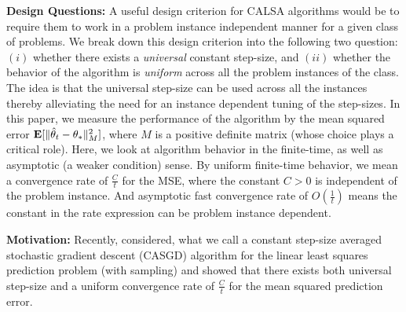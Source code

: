 \textbf{Design Questions:} A useful design criterion for CALSA algorithms would be to require them to work in a problem instance independent manner for a given class of  problems. We break down this design criterion into the following two question: $(i)$ whether there exists a \emph{universal} constant step-size, and $(ii)$ whether the behavior of the algorithm is \emph{uniform} across all the problem instances of the class. The idea is that the universal step-size can be used across all the instances thereby alleviating the need for an instance dependent tuning of the step-sizes. In this paper, we measure the performance of the algorithm by the mean squared error $\mathbf{E}[\| \hat{\theta}_t-\theta_*\|^2_M]$, where $M$ is a positive definite matrix (whose choice plays a critical role). Here, we look at algorithm behavior in the finite-time, as well as asymptotic (a weaker condition) sense. By uniform finite-time behavior, we mean a convergence rate of $\frac{C}{t}$ for the MSE, where the constant $C>0$ is independent of the problem instance. And asymptotic fast convergence rate of $O(\frac{1}{t})$ means the constant in the rate expression can be problem instance dependent.

\textbf{Motivation:} Recently, \citet{bach} considered, what we call a constant step-size averaged stochastic gradient descent (CASGD) 
 algorithm for the linear least squares prediction problem (with \iid sampling) and showed that there exists both universal step-size and a uniform convergence rate of $\frac{C}{t}$ for the mean squared prediction error.


